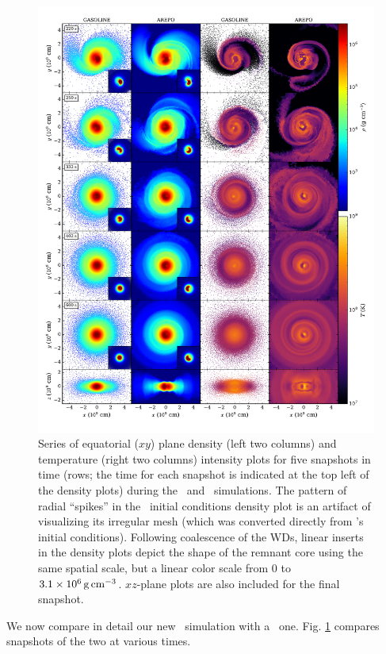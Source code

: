 \begin{figure}
\centering
\includegraphics[angle=0,width=1.0\columnwidth]{chapter3_zhu+u/figures/snapshots2.pdf}
\caption{Series of equatorial ($xy$) plane density (left two columns) and temperature (right two columns) intensity plots for five snapshots in time (rows; the time for each snapshot is indicated at the top left of the density plots) during the \gasoline\ and \arepo\ simulations.  {\charles The pattern of radial ``spikes'' in the \arepo\ initial conditions density plot is an artifact of visualizing its irregular mesh (which was converted directly from \gasoline's initial conditions).}  Following coalescence of the WDs, linear inserts in the density plots depict the shape of the remnant core using the same spatial scale, but a linear color scale from $0$ to $3.1\times10^6\,\gcc$.  $xz$-plane plots are also included for the final snapshot.}
\label{fig:c3_diagslice}
\end{figure}

We now compare in detail our new \arepo\ simulation with a \gasoline\ one.  Fig. \ref{fig:c3_diagslice} compares snapshots of the two at various times.

